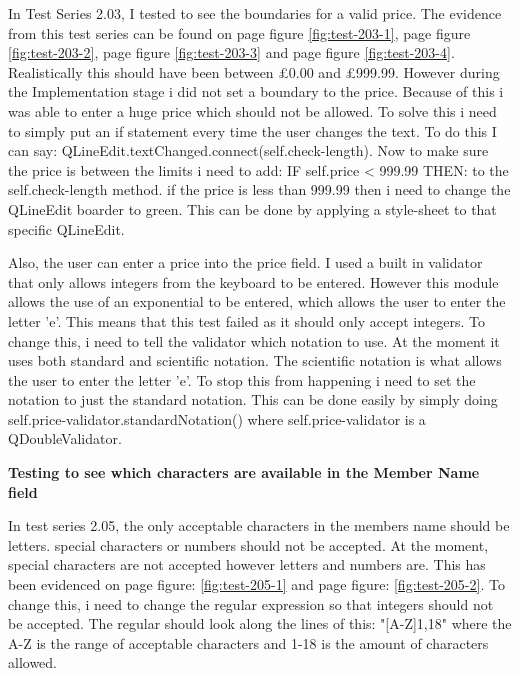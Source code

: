In Test Series 2.03, I tested to see the boundaries for a valid price. The evidence from this test series can be found on  page \pageref{fig:test-203-1} figure \ref{fig:test-203-1}, page \pageref{fig:test-203-2} figure \ref{fig:test-203-2}, page \pageref{fig:test-203-3} figure \ref{fig:test-203-3} and page \pageref{fig:test-203-4} figure \ref{fig:test-203-4}. Realistically this should have been between £0.00 and £999.99. However during the Implementation stage i did not set a boundary to the price. Because of this i was able to enter a huge price which should not be allowed. To solve this i need to simply put an if statement every time the user changes the text. To do this I can say: QLineEdit.textChanged.connect(self.check-length). Now to make sure the price is between the limits i need to add: IF self.price < 999.99 THEN: to the self.check-length method. if the price is less than 999.99 then i need to change the QLineEdit boarder to green. This can be done by applying a style-sheet to that specific QLineEdit.

Also, the user can enter a price into the price field. I used a built in validator that only allows integers from the keyboard to be entered. However this module allows the use of an exponential to be entered, which allows the user to enter the letter 'e'. This means that this test failed as it should only accept integers. To change this, i need to tell the validator which notation to use. At the moment it uses both standard and scientific notation. The scientific notation is what allows the user to enter the letter 'e'. To stop this from happening i need to set the notation to just the standard notation. This can be done easily by simply doing self.price-validator.standardNotation() where self.price-validator is a QDoubleValidator.

\textbf{Testing to see which characters are available in the Member Name field}

In test series 2.05, the only acceptable characters in the members name should be letters. special characters or numbers should not be accepted. At the moment, special characters are not accepted however letters and numbers are. This has been evidenced on page \pageref{fig:test-205-1} figure: \ref{fig:test-205-1}  and page \pageref{fig:test-205-2} figure: \ref{fig:test-205-2}. To change this, i need to change the regular expression so that integers should not be accepted. The regular should look along the lines of this: "[A-Z]{1,18}" where the A-Z is the range  of acceptable characters and 1-18 is the amount of characters allowed. 


